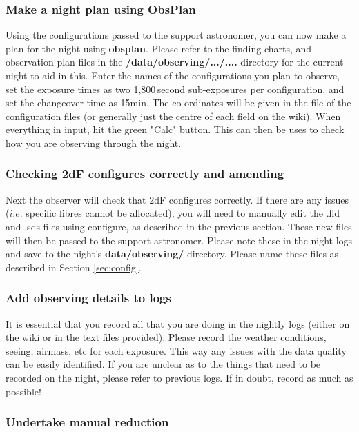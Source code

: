 \documentclass[12pt]{article}
\begin{document}
\subsubsection{Make a night plan using ObsPlan}

Using the configurations passed to the support astronomer, you can now make a plan for the night using \textbf{obsplan}. Please refer to the finding charts, and observation plan files in the \textbf{/data/observing/.../....} directory for the current night to aid in this. Enter the names of the configurations you plan to observe, set the exposure times as two 1,800\,second sub-exposures per configuration, and set the changeover time as 15min. The co-ordinates will be given in the file of the configuration files (or generally just the centre of each field on the wiki). When everything in input, hit the green "Calc" button. This can then be uses to check how you are observing through the night.      

\subsubsection{Checking 2dF configures correctly and amending}

Next the observer will check that 2dF configures correctly. If there are any issues ($i.e.$ specific fibres cannot be allocated), you will need to manually edit the .fld and .sds files using configure, as described in the previous section. These new files will then be passed to the support astronomer. Please note these in the night logs and save to the night's \textbf{data/observing/} directory. Please name these files as described in Section \ref{sec:config}.

\subsubsection{Add observing details to logs}

It is essential that you record all that you are doing in the nightly logs (either on the wiki or in the text files provided). Please record the weather conditions, seeing, airmass, etc for each exposure. This way any issues with the data quality can be easily identified. If you are unclear as to the things that need to be recorded on the night, please refer to previous logs. If in doubt, record as much as possible! 


\subsubsection{Undertake manual reduction}
\end{document}
